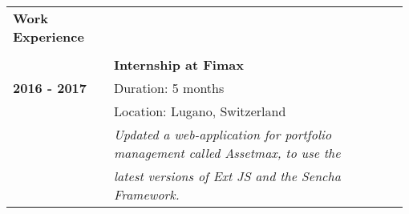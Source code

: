 
\noindent
\begin{table}[h]
    \begin{tabular*}{\textwidth}{@{}p{0.25\linewidth}@{}p{0.735\linewidth}}
        {\large\color{mediumpersianblue}\textbf{Work Experience}} & \\
        \arrayrulecolor{gray}\cline{1-2}
        \vspace{-0.2cm}
        & \\
        & \textbf{Internship at Fimax} \\
        \textcolor[gray]{0.5}{\textbf{2016 - 2017}} & {\small Duration: 5 months} \\
        & {\small Location: Lugano, Switzerland} \\
        & \textsl{\small Updated a web-application for portfolio management called Assetmax, to use the} \\
        & \textsl{\small  latest versions of Ext JS and the Sencha Framework.}
    \end{tabular*}
\end{table}
